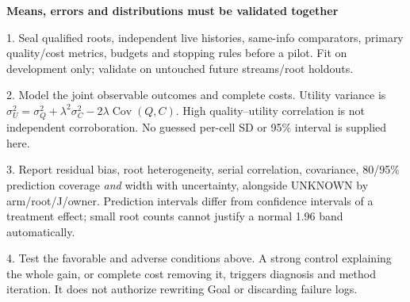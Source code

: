 \documentclass[10pt,a4paper]{article}
\newcommand{\lead}[1]{\vspace{4pt}\textbf{#1}\par}
\begin{document}
\lead{Means, errors and distributions must be validated together}
\small
1. Seal qualified roots, independent live histories, same-info comparators,
primary quality/cost metrics, budgets and stopping rules before a pilot.
Fit on development only; validate on untouched future streams/root holdouts.\par
2. Model the joint observable outcomes and complete costs. Utility variance is
$\sigma_U^2=\sigma_Q^2+\lambda^2\sigma_C^2-2\lambda\operatorname{Cov}(Q,C)$.
High quality--utility correlation is not independent corroboration. No guessed
per-cell SD or 95\% interval is supplied here.\par
3. Report residual bias, root heterogeneity, serial correlation, covariance,
80/95\% prediction coverage \emph{and} width with uncertainty, alongside
UNKNOWN by arm/root/J/owner. Prediction intervals differ from confidence
intervals of a treatment effect; small root counts cannot justify a normal
1.96 band automatically.\par
4. Test the favorable and adverse conditions above. A strong control explaining
the whole gain, or complete cost removing it, triggers diagnosis and method
iteration. It does not authorize rewriting Goal or discarding failure logs.\normalsize
\end{document}
